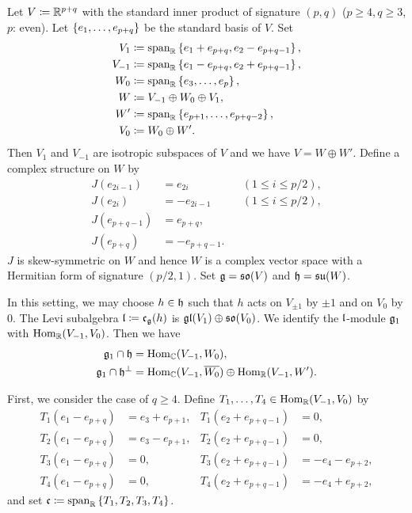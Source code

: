 Let $V \coloneq \mathbb{R}^{p+q}$ with the standard inner product of signature $(p, q)$ ($p\geq 4, q \geq 3$, $p$: even).
Let $\left\{e_1, \ldots, e_{p+q} \right\}$ be the standard basis of $V$.
Set
\begin{align*}
	V_1 &\coloneq \mathrm{span}_{\mathbb{R}}\left\{e_1 + e_{p+q}, e_2 - e_{p+q-1}\right\}, \\
	V_{-1} &\coloneq \mathrm{span}_{\mathbb{R}}\left\{e_1 - e_{p+q}, e_2 + e_{p+q-1}\right\}, \\
	W_0 &\coloneq \mathrm{span}_{\mathbb{R}}\left\{e_3, \ldots, e_{p}\right\}, \\
	W &\coloneq V_{-1} \oplus W_0 \oplus V_{1}, \\
	W' &\coloneq \mathrm{span}_{\mathbb{R}}\left\{e_{p+1}, \ldots, e_{p+q-2}\right\}, \\
	V_0 &\coloneq W_0 \oplus W'.
\end{align*}
Then $V_1$ and $V_{-1}$ are isotropic subspaces of $V$ and we have $V = W \oplus W'$.
Define a complex structure on $W$ by
\begin{align*}
	J(e_{2i-1}) &= e_{2i} &&(1\leq i \leq p/2), \\
	J(e_{2i}) &= -e_{2i-1} &&(1\leq i \leq p/2), \\
	J(e_{p+q-1}) &= e_{p+q}, \\
	J(e_{p+q}) &= -e_{p+q-1}.
\end{align*}
$J$ is skew-symmetric on $W$ and hence $W$ is a complex vector space with a Hermitian form of signature $(p/2, 1)$.
Set $\mathfrak{g} = \mathfrak{so}(V)$ and $\mathfrak{h} = \mathfrak{su}(W)$.

In this setting, we may choose $h \in \mathfrak{h}$ such that $h$ acts on $V_{\pm 1}$ by $\pm 1$ and on $V_0$ by $0$.
The Levi subalgebra $\mathfrak{l} \coloneq \mathfrak{c}_{\mathfrak{g}}(h)$ is $\mathfrak{gl}(V_1) \oplus \mathfrak{so}(V_0)$.
We identify the $\mathfrak{l}$-module $\mathfrak{g}_1$ with $\mathrm{Hom}_{\mathbb{R}}(V_{-1}, V_0)$.
Then we have
\begin{align*}
	\mathfrak{g}_1 \cap \mathfrak{h} &= \mathrm{Hom}_{\mathbb{C}}(V_{-1}, W_0), \\
	\mathfrak{g}_1 \cap \mathfrak{h}^\perp &= \mathrm{Hom}_{\mathbb{C}}(V_{-1}, \overline{W_0}) \oplus \mathrm{Hom}_{\mathbb{R}}(V_{-1}, W').
\end{align*}

First, we consider the case of $q \geq 4$.
Define $T_1, \ldots, T_4 \in \mathrm{Hom}_{\mathbb{R}}(V_{-1}, V_0)$ by
\begin{align*}
	T_1(e_1 - e_{p+q}) &= e_3 + e_{p+1}, & T_1(e_2 + e_{p+q-1}) &= 0, \\
	T_2(e_1 - e_{p+q}) &= e_{3} - e_{p+1}, & T_2(e_2 + e_{p+q-1}) &= 0, \\
	T_3(e_1 - e_{p+q}) &= 0, & T_3(e_2 + e_{p+q-1}) &= -e_4 - e_{p+2}, \\
	T_4(e_1 - e_{p+q}) &= 0, & T_4(e_2 + e_{p+q-1}) &= -e_4 + e_{p+2},
\end{align*}
and set $\mathfrak{c} \coloneq \mathrm{span}_{\mathbb{R}}\left\{T_1, T_2, T_3, T_4\right\}$.

